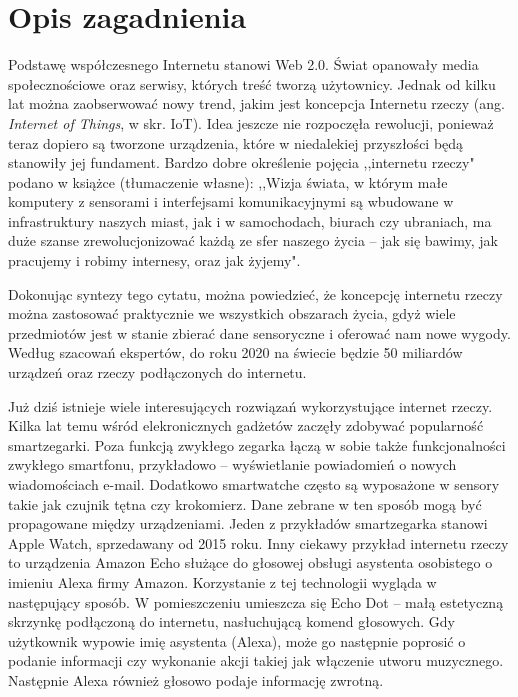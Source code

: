 \documentclass[a4paper,twoside,titlepage,openright]{book}
\begin{document}
\section*{Opis zagadnienia}

Podstawę współczesnego Internetu stanowi Web 2.0. Świat opanowały media społecznościowe oraz serwisy, których treść tworzą użytownicy. Jednak od kilku lat można zaobserwować nowy trend, jakim jest koncepcja Internetu rzeczy (ang. \textit{Internet of Things}, w skr. IoT). Idea jeszcze nie rozpoczęła rewolucji, ponieważ teraz dopiero są tworzone urządzenia, które w niedalekiej przyszłości będą stanowiły jej fundament. Bardzo dobre określenie pojęcia ,,internetu rzeczy" podano w książce \cite{iotopis} (tłumaczenie własne): ,,Wizja świata, w którym małe komputery z sensorami i interfejsami komunikacyjnymi są wbudowane w infrastruktury naszych miast, jak i w samochodach, biurach czy ubraniach, ma duże szanse zrewolucjonizować każdą ze sfer naszego życia -- jak się bawimy, jak pracujemy i robimy internesy, oraz jak żyjemy". 

Dokonując syntezy tego cytatu, można powiedzieć, że koncepcję internetu rzeczy można zastosować praktycznie we wszystkich obszarach życia, gdyż wiele przedmiotów jest w stanie zbierać dane sensoryczne i oferować nam nowe wygody. Według szacowań ekspertów, do roku 2020 na świecie będzie 50 miliardów urządzeń oraz rzeczy podłączonych do internetu. \cite{miliardyUrz}

Już dziś istnieje wiele interesujących rozwiązań wykorzystujące internet rzeczy. Kilka lat temu wśród elekronicznych gadżetów zaczęły zdobywać popularność smartzegarki. Poza funkcją zwykłego zegarka łączą w sobie także funkcjonalności zwykłego smartfonu, przykładowo -- wyświetlanie powiadomień o nowych wiadomościach e-mail. Dodatkowo smartwatche często są wyposażone w sensory takie jak czujnik tętna czy krokomierz. Dane zebrane w ten sposób mogą być propagowane między urządzeniami. Jeden z przykładów smartzegarka stanowi Apple Watch, sprzedawany od 2015 roku. Inny ciekawy przykład internetu rzeczy to urządzenia Amazon Echo służące do głosowej obsługi asystenta osobistego o imieniu Alexa firmy Amazon. Korzystanie z tej technologii wygląda w następujący sposób. W pomieszczeniu umieszcza się Echo Dot -- małą estetyczną skrzynkę podłączoną do internetu, nasłuchującą komend głosowych. Gdy użytkownik wypowie imię asystenta (Alexa), może go następnie poprosić o podanie informacji czy wykonanie akcji takiej jak włączenie utworu muzycznego. Następnie Alexa również głosowo podaje informację zwrotną. \cite{amazonEcho}
\end{document}
